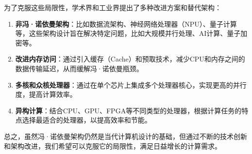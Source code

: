 \documentclass[12pt]{article} %
\theoremstyle{definition}
\begin{document}
为了克服这些局限性，学术界和工业界提出了多种改进方案和替代架构：
\begin{enumerate}
  \item \textbf{非冯·诺依曼架构}：比如数据流架构、神经网络处理器（NPU）、量子计算等，这些架构设计旨在解决特定问题，比如大规模并行处理、AI计算、量子加密等。
  \item \textbf{改进内存访问}：通过引入缓存（Cache）和预取技术，减少CPU和内存之间的数据传输延迟，从而缓解冯·诺依曼瓶颈。
  \item \textbf{多核和众核处理器}：通过在单个芯片上集成多个处理器核心，实现更高的并行度，提高计算效率。
  \item \textbf{异构计算}：结合CPU、GPU、FPGA等不同类型的处理器，根据计算任务的特点选择最适合的处理器，以提高效率和节能。
\end{enumerate}

总之，虽然冯·诺依曼架构仍然是当代计算机设计的基础，但通过不断的技术创新和架构改进，我们希望可以克服它的局限性，满足日益增长的计算需求。

\newpage



\end{document}
